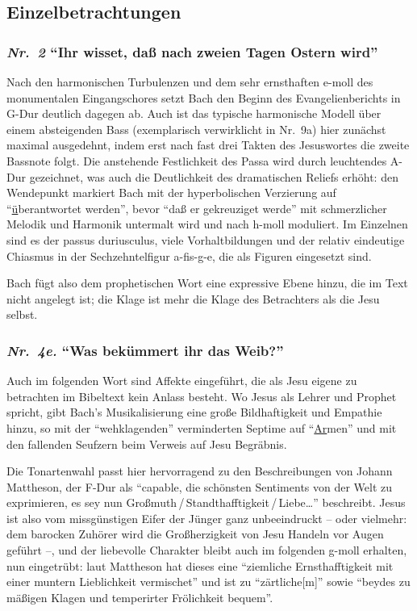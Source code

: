 \documentclass[a4paper,11pt,twoside]{scrartcl}
\newcommand{\Nr}[1]{\textmd{\textit{Nr.~#1}}}
\begin{document}
\subsection{Einzelbetrachtungen}
\subsubsection*{\Nr{2} \enquote{Ihr wisset, daß nach zweien Tagen Ostern wird}}
Nach den harmonischen Turbulenzen und dem sehr ernsthaften e-moll des
monumentalen Eingangschores setzt Bach den Beginn des Evangelienberichts
in G-Dur deutlich dagegen ab.  Auch ist das typische harmonische
Modell über einem absteigenden Bass (exemplarisch verwirklicht
in Nr.~9a) hier zunächst maximal ausgedehnt, indem erst nach fast drei
Takten des Jesuswortes die zweite Bassnote folgt.  Die anstehende
Festlichkeit des Passa wird durch leuchtendes A-Dur gezeichnet, was
auch die Deutlichkeit des dramatischen Reliefs erhöht: den
Wendepunkt markiert Bach mit der hyperbolischen Verzierung auf
\enquote{\underline{ü}berantwortet werden}, bevor \enquote{daß er
gekreuziget werde} mit schmerzlicher Melodik und Harmonik untermalt
wird und nach h-moll moduliert.  Im Einzelnen sind es der passus
duriusculus, viele Vorhaltbildungen und der relativ eindeutige Chiasmus
in der Sechzehntelfigur a-fis-g-e, die als Figuren eingesetzt sind.

Bach fügt also dem prophetischen Wort eine expressive Ebene hinzu,
die im Text nicht angelegt ist; die Klage ist mehr die Klage des
Betrachters als die Jesu selbst.

\subsubsection*{\Nr{4e.} \enquote{Was bekümmert ihr das Weib?}}
Auch im folgenden Wort sind Affekte eingeführt, die als Jesu eigene
zu betrachten im Bibeltext kein Anlass besteht.  Wo Jesus als Lehrer
und Prophet spricht, gibt Bach’s Musikalisierung eine große Bildhaftigkeit
und Empathie hinzu, so mit der \enquote{wehklagenden}\cite[2.~Theil,
1.~Abtheilung, S.~104]{kirnberger} verminderten Septime auf
\enquote{\underline{Ar}men} und mit den fallenden Seufzern beim
Verweis auf Jesu Begräbnis.

Die Tonartenwahl passt hier hervorragend zu den Beschreibungen
von Johann Mattheson\cite[S.~236–252]{mattheson}, der F-Dur als
\enquote{capable, die schönsten Sentiments von der Welt zu
exprimieren, es sey nun Großmuth\,/\,Standthafftigkeit\,/\,Liebe…}
beschreibt.  Jesus ist also vom missgünstigen Eifer der Jünger ganz
unbeeindruckt – oder vielmehr: dem barocken Zuhörer wird die
Großherzigkeit von Jesu Handeln vor Augen geführt –, und der
liebevolle Charakter bleibt auch im folgenden g-moll erhalten,
nun eingetrübt: laut Mattheson hat dieses eine \enquote{ziemliche
Ernsthafftigkeit mit einer muntern Lieblichkeit vermischet} und
ist zu \enquote{zärtliche[m]} sowie \enquote{beydes zu mäßigen
Klagen und temperirter Frölichkeit bequem}.
\end{document}
